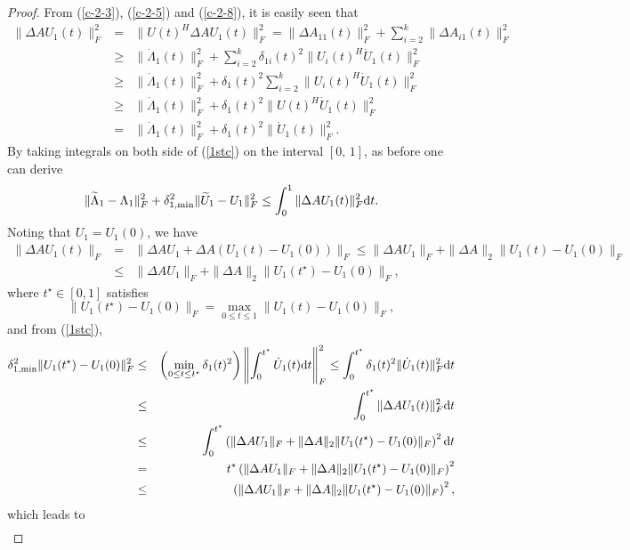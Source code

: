 \documentclass[11pt,a4paper]{article}
\numberwithin{equation}{section}
\newcommand {\bstar}  {\begin{eqnarray*}}
\newcommand {\estar} {\end{eqnarray*}}
\newcommand {\wt} {\widetilde}
\begin{document}
\medskip
\begin{proof} From (\ref{c-2-3}), (\ref{c-2-5}) and (\ref{c-2-8}),
it is easily seen that
\begin{eqnarray}
\nonumber
\|{\Delta AU_1(t)}\|_F^2&=&
\|{U(t)^H\Delta AU_1(t)}\|_F^2=\|{\Delta A_{11}(t)}\|_F^2+\sum_{i=2}^k\|{\Delta A_{i1}(t)}\|_F^2\\
\nonumber
&\geq&\|{\dot\Lambda_1(t)}\|_F^2+\sum_{i=2}^k\delta_{1i}(t)^2\|{U_i(t)^H\dot U_1(t)}\|_F^2\nonumber\\
&\ge &\|{\dot\Lambda_1(t)}\|_F^2
+\delta_1(t)^2\sum_{i=2}^k\|{U_i(t)^H\dot U_1(t)}\|_F^2\nonumber\\
&\ge& \|{\dot\Lambda_1(t)}\|_F^2+\delta_1(t)^2\|{U(t)^H\dot U_1(t)}\|_F^2
\nonumber\\
\label{1stc}
&=&\|{\dot\Lambda_1(t)}\|_F^2+\delta_1(t)^2\|{\dot U_1(t)}\|_F^2.
\end{eqnarray}
By taking integrals on both side of (\ref{1stc}) on the interval $[0,\,1]$, as before
one can derive
\begin{eqnarray}\label{c-2-16}
\|\wt\Lambda_1-\Lambda_1\|_F^2+\delta_{1,\min}^2\|{\wt U_1-U_1}\|_F^2
\leq\int_0^1\|{\Delta A U_1(t)}\|_F^2{\rm d}t.
\end{eqnarray}
Noting that $U_1=U_1(0)$, we have
\begin{eqnarray}\label{c-2-17}
\|{\Delta A U_1(t)}\|_F&=&
\|{\Delta AU_1+\Delta A(U_1(t)-U_1(0))}\|_F\le
 \|{\Delta AU_1}\|_F+\|{\Delta A}\|_2\|{U_1(t)-U_1(0)}\|_F\nonumber\\
&\le& \|{\Delta AU_1}\|_F+\|{\Delta A}\|_2\|{U_1(t^\star)-U_1(0)}\|_F,
\end{eqnarray}
where $t^\star\in [0,1]$ satisfies
\[
\|{U_1(t^\star)-U_1(0)}\|_F=\max_{0\le t\le 1}\|{U_1(t)-U_1(0)}\|_F,
\]
\noindent and from (\ref{1stc}),
\bstar
\delta_{1,\min}^2\|{U_1(t^\star)-U_1(0)}\|_F^2
&\le&\left(\min_{0\le t\le t^\star}\delta_1(t)^2\right)\left\|\int_0^{t^\star}\dot U_1(t){\rm d}t\right\|_F^2
\leq\int_0^{t^\star}\delta_1(t)^2\|{\dot U_1(t)}\|_F^2{\rm d}t\\
&\le&\int_0^{t^\star}\|{\Delta A U_1(t)}\|_F^2{\rm d}t\\
&\le&\int_0^{t^\star} \left(\|{\Delta AU_1}\|_F+\|{\Delta A}\|_2\|{U_1(t^\star)-U_1(0)}\|_F\right)^2{\rm d}t\\
&=&t^\ast  \left(\|{\Delta AU_1}\|_F+\|{\Delta A}\|_2\|{U_1(t^\star)-U_1(0)}\|_F\right)^2\\
&\leq&  \left(\|{\Delta AU_1}\|_F+\|{\Delta A}\|_2\|{U_1(t^\star)-U_1(0)}\|_F\right)^2,
\estar
which leads to
\begin{eqnarray}\label{c-2-18}

\end{eqnarray}
\end{proof}
\end{document}
